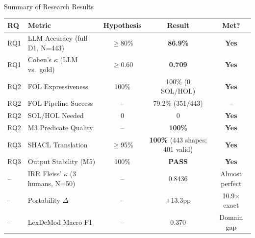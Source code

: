 \documentclass[aspectratio=169, 10pt]{beamer}
\begin{document}
\begin{frame}{Summary of Research Results}
    \begin{table}[]
        \centering
        \small
        \begin{tabular}{llccc}
            \toprule
            \textbf{RQ} & \textbf{Metric} & \textbf{Hypothesis} & \textbf{Result} & \textbf{Met?} \\
            \midrule
            RQ1 & LLM Accuracy (full D1, N=443) & $\geq$80\% & \textbf{86.9\%} & \textbf{Yes} \\
            RQ1 & Cohen's $\kappa$ (LLM vs.\ gold) & $\geq$0.60 & \textbf{0.709} & \textbf{Yes} \\
            RQ2 & FOL Expressiveness & 100\% & 100\% (0 SOL/HOL) & \textbf{Yes} \\
            RQ2 & FOL Pipeline Success & -- & 79.2\% (351/443) & -- \\
            RQ2 & SOL/HOL Needed & 0 & 0 & \textbf{Yes} \\
            RQ2 & M3 Predicate Quality & -- & \textbf{100\%} & \textbf{Yes} \\
            RQ3 & SHACL Translation & $\geq$95\% & \textbf{100\%} (443 shapes; 401 valid) & \textbf{Yes} \\
            RQ3 & Output Stability (M5) & 100\% & \textbf{PASS} & \textbf{Yes} \\
            \midrule
            -- & IRR Fleiss' $\kappa$ (3 humans, N=50) & -- & 0.8436 & Almost perfect \\
            -- & Portability $\Delta$ & -- & +13.3pp & 10.9$\times$ exact \\
            -- & LexDeMod Macro F1 & -- & 0.370 & Domain gap \\
            \bottomrule
        \end{tabular}
    \end{table}
\end{frame}
\end{document}

